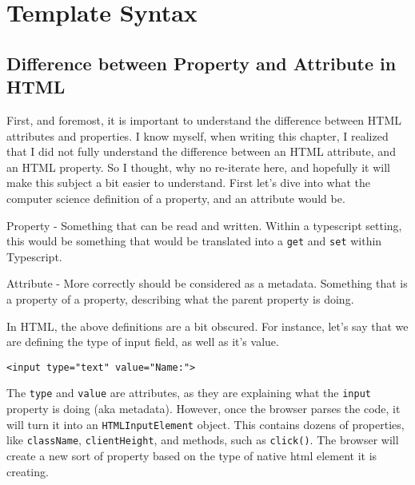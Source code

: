 \maketitle{}
\section{ Template Syntax }

\subsection{ Difference between Property and Attribute in HTML }

First, and foremost, it is important to understand the difference between HTML 
attributes and properties. I know myself, when writing this chapter, I realized
that I did not fully understand the difference between an HTML attribute, and
an HTML property. So I thought, why no re-iterate here, and hopefully it will
make this subject a bit easier to understand. First let's dive into what the 
computer science definition of a property, and an attribute would be. 

Property - Something that can be read and written. Within a typescript setting, 
this would be something that would be translated into a \lstinline{get} and  
\lstinline{set} within Typescript. 

Attribute - More correctly should be considered as a metadata. Something that
is a property of a property, describing what the parent property is doing. 

In HTML, the above definitions are a bit obscured. For instance, let's say
that we are defining the type of input field, as well as it's value. 
\begin{lstlisting}
<input type="text" value="Name:">  
\end{lstlisting}

The \lstinline{type} and \lstinline{value} are attributes, as they are 
explaining what the \lstinline{input} property is doing (aka metadata).
However, once the browser parses the code, it will turn it into an 
\lstinline{HTMLInputElement} object. This contains dozens of properties, like 
\lstinline{className}, \lstinline{clientHeight}, and methods, such as 
\lstinline{click()}. The browser will create a new sort of property based on 
the type of native html element it is creating. 


